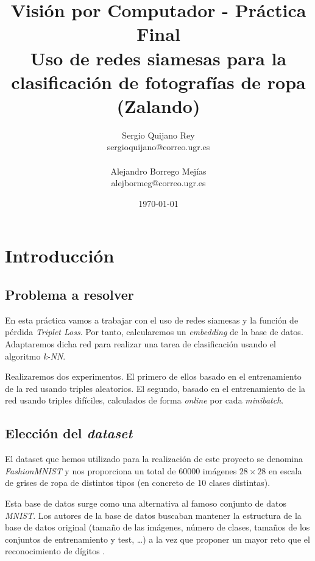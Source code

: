 \documentclass[11pt]{article}
\title{
    {Visión por Computador - Práctica Final} \\
    {Uso de redes siamesas para la clasificación de fotografías de ropa (Zalando)}
}
\author{
    {Sergio Quijano Rey}\\
    {sergioquijano@correo.ugr.es} \\
    {}\\
    {Alejandro Borrego Mejías} \\
    {alejbormeg@correo.ugr.es}\\
}
\date{\today}
\begin{document}
\maketitle
\pagebreak

\tableofcontents


\listoffigures

\listoftables

{}

\pagebreak

\section{Introducción}

\subsection{Problema a resolver}

En esta práctica vamos a trabajar con el uso de redes siamesas y la función de pérdida \emph{Triplet Loss}. Por tanto, calcularemos un \emph{embedding} de la base de datos. Adaptaremos dicha red para realizar una tarea de clasificación usando el algoritmo \emph{k-NN}.

Realizaremos dos experimentos. El primero de ellos basado en el entrenamiento de la red usando triples aleatorios. El segundo, basado en el entrenamiento de la red usando triples difíciles, calculados de forma \emph{online} por cada \emph{minibatch}.

\subsection{Elección del \emph{dataset}}

El dataset que hemos utilizado para la realización de este proyecto se denomina \emph{FashionMNIST} \cite{zalando_dataset:online} y nos proporciona un total de 60000 imágenes $28 \times 28$ en escala de grises de ropa de distintos tipos (en concreto de 10 clases distintas). 

Esta base de datos surge como una alternativa al famoso conjunto de datos \emph{MNIST}. Los autores de la base de datos buscaban mantener la estructura de la base de datos original (tamaño de las imágenes, número de clases, tamaños de los conjuntos de entrenamiento y test, \ldots) a la vez que proponer un mayor reto que el reconocimiento de dígitos \cite{database_why:online}.
\end{document}
